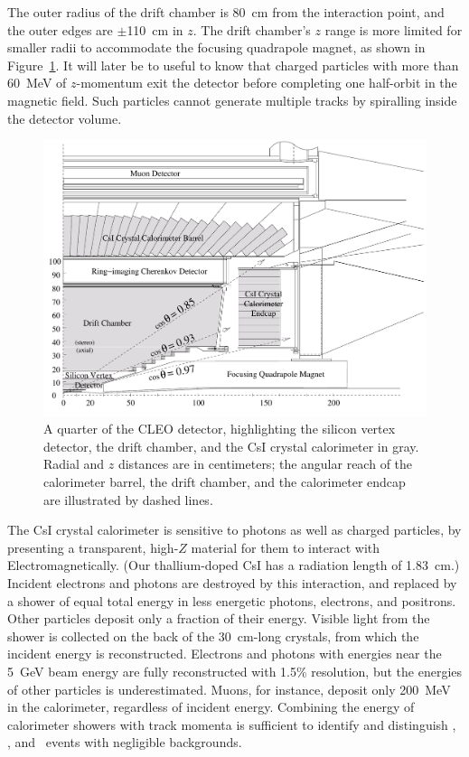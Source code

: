 \documentclass{cornell}
\begin{document}
The outer radius of the drift chamber is 80~cm from the interaction
point, and the outer edges are $\pm$110~cm in $z$.  The drift
chamber's $z$ range is more limited for smaller radii to accommodate
the focusing quadrapole magnet, as shown in Figure~\ref{quarterview}.
It will later be to useful to know that charged particles with more than
60~MeV of $z$-momentum exit the detector before completing one
half-orbit in the magnetic field.  Such particles cannot generate
multiple tracks by spiralling inside the detector volume.
\label{pag:spiraling}

\begin{figure}
  \begin{center}
    \includegraphics[width=0.7\linewidth]{plots/quarterview}
  \end{center}
  \caption[Quarter-view of the CLEO detector]{\label{quarterview} A
  quarter of the CLEO detector, highlighting the silicon vertex
  detector, the drift chamber, and the CsI crystal calorimeter in
  gray.  Radial and $z$ distances are in centimeters; the angular
  reach of the calorimeter barrel, the drift chamber, and the
  calorimeter endcap are illustrated by dashed lines.}
\end{figure}

The CsI crystal calorimeter is sensitive to photons as well as charged
particles, by presenting a transparent, high-$Z$ material for them to
interact with Electromagnetically.  (Our thallium-doped CsI has a
radiation length of 1.83~cm.)  Incident electrons and photons are
destroyed by this interaction, and replaced by a shower of equal total
energy in less energetic photons, electrons, and positrons.  Other
particles deposit only a fraction of their energy.  Visible light from
the shower is collected on the back of the 30~cm-long crystals, from
which the incident energy is reconstructed.  Electrons and photons
with energies near the 5~GeV beam energy are fully reconstructed with
1.5\% resolution, but the energies of other particles is
underestimated.  Muons, for instance, deposit only 200~MeV in the
calorimeter, regardless of incident energy.  Combining the energy of
calorimeter showers with track momenta is sufficient to identify and
distinguish \ee, \mumu, and \gamgam\ events with negligible
backgrounds.
\end{document}
